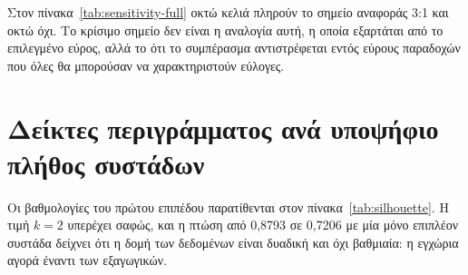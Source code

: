 \begin{appendix}
Στον πίνακα~\ref{tab:sensitivity-full} οκτώ κελιά πληρούν το σημείο αναφοράς
3:1 και οκτώ όχι. Το κρίσιμο σημείο δεν
είναι η αναλογία αυτή, η οποία εξαρτάται από το επιλεγμένο εύρος, αλλά το ότι
το συμπέρασμα αντιστρέφεται εντός εύρους παραδοχών που όλες θα μπορούσαν να
χαρακτηριστούν εύλογες.

\section{Δείκτες περιγράμματος ανά υποψήφιο πλήθος συστάδων}

Οι βαθμολογίες του πρώτου επιπέδου παρατίθενται στον
πίνακα~\ref{tab:silhouette}. Η τιμή $k=2$ υπερέχει σαφώς, και η πτώση από
0,8793 σε 0,7206 με μία μόνο επιπλέον συστάδα δείχνει ότι η δομή των δεδομένων
είναι δυαδική και όχι βαθμιαία: η εγχώρια αγορά έναντι των εξαγωγικών.

\end{appendix}
